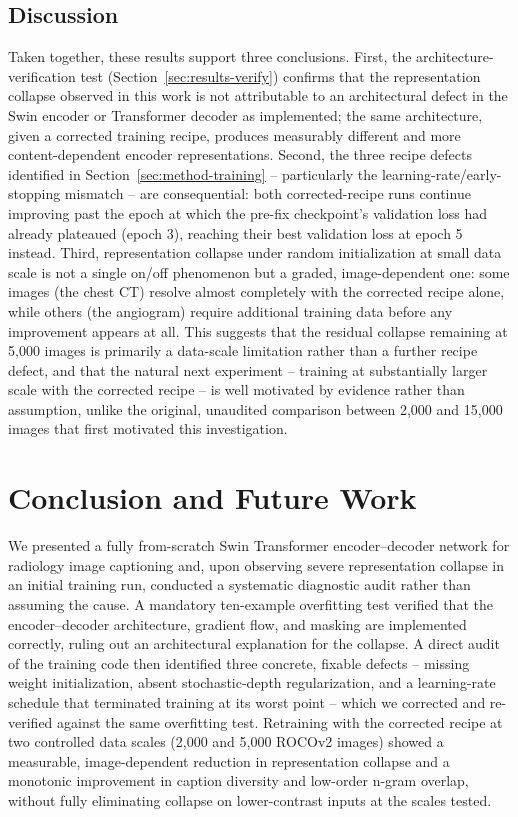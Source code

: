 \documentclass[conference]{IEEEtran}
\begin{document}
\subsection{Discussion}
\label{sec:results-discussion}
Taken together, these results support three conclusions. First, the architecture-verification test (Section~\ref{sec:results-verify}) confirms that the representation collapse observed in this work is not attributable to an architectural defect in the Swin encoder or Transformer decoder as implemented; the same architecture, given a corrected training recipe, produces measurably different and more content-dependent encoder representations. Second, the three recipe defects identified in Section~\ref{sec:method-training} -- particularly the learning-rate/early-stopping mismatch -- are consequential: both corrected-recipe runs continue improving past the epoch at which the pre-fix checkpoint's validation loss had already plateaued (epoch 3), reaching their best validation loss at epoch 5 instead. Third, representation collapse under random initialization at small data scale is not a single on/off phenomenon but a graded, image-dependent one: some images (the chest CT) resolve almost completely with the corrected recipe alone, while others (the angiogram) require additional training data before any improvement appears at all. This suggests that the residual collapse remaining at 5,000 images is primarily a data-scale limitation rather than a further recipe defect, and that the natural next experiment -- training at substantially larger scale with the corrected recipe -- is well motivated by evidence rather than assumption, unlike the original, unaudited comparison between 2,000 and 15,000 images that first motivated this investigation.

\section{Conclusion and Future Work}
\label{sec:conclusion}

We presented a fully from-scratch Swin Transformer encoder--decoder network for radiology image captioning and, upon observing severe representation collapse in an initial training run, conducted a systematic diagnostic audit rather than assuming the cause. A mandatory ten-example overfitting test verified that the encoder--decoder architecture, gradient flow, and masking are implemented correctly, ruling out an architectural explanation for the collapse. A direct audit of the training code then identified three concrete, fixable defects -- missing weight initialization, absent stochastic-depth regularization, and a learning-rate schedule that terminated training at its worst point -- which we corrected and re-verified against the same overfitting test. Retraining with the corrected recipe at two controlled data scales (2,000 and 5,000 ROCOv2 images) showed a measurable, image-dependent reduction in representation collapse and a monotonic improvement in caption diversity and low-order n-gram overlap, without fully eliminating collapse on lower-contrast inputs at the scales tested.
\end{document}
